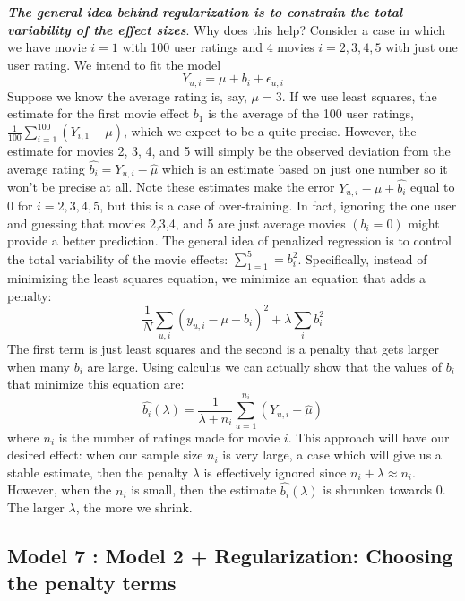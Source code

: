 \documentclass[
]{article}
\begin{document}
\textbf{\emph{The general idea behind regularization is to constrain the
total variability of the effect sizes}}. Why does this help? Consider a
case in which we have movie \(i=1\) with 100 user ratings and 4 movies
\(i=2,3,4,5\) with just one user rating. We intend to fit the model\\
\[Y_{u,i}=\mu+b_{i}+\epsilon_{u,i}\] Suppose we know the average rating
is, say, \(\mu=3\). If we use least squares, the estimate for the first
movie effect \(b_{1}\) is the average of the 100 user ratings,
\(\frac{1}{100}\sum_{i=1}^{100}(Y_{i,1}-\mu)\), which we expect to be a
quite precise. However, the estimate for movies 2, 3, 4, and 5 will
simply be the observed deviation from the average rating
\(\hat{b_{i}}=Y_{u,i}-\hat{\mu}\) which is an estimate based on just one
number so it won't be precise at all. Note these estimates make the
error \(Y_{u,i}-\mu+\hat{b_{i}}\) equal to 0 for \(i=2,3,4,5\), but this
is a case of over-training. In fact, ignoring the one user and guessing
that movies 2,3,4, and 5 are just average movies \((b_{i}=0)\) might
provide a better prediction. The general idea of penalized regression is
to control the total variability of the movie effects:
\(\sum_{1=1}^{5}=b_{i}^2\). Specifically, instead of minimizing the
least squares equation, we minimize an equation that adds a penalty:\\
\[\frac{1}{N}\sum_{u,i}(y_{u,i}-\mu-b_{i})^2+\lambda\sum_{i}b_{i}^2\]
The first term is just least squares and the second is a penalty that
gets larger when many \(b_{i}\) are large. Using calculus we can
actually show that the values of \(b_{i}\) that minimize this equation
are:\\
\[\hat{b_{i}}(\lambda)=\frac{1}{\lambda+n_{i}}\sum_{u=1}^{n_{i}}(Y_{u,i}-\hat{\mu})\]
where \(n_{i}\) is the number of ratings made for movie \(i\). This
approach will have our desired effect: when our sample size \(n_{i}\) is
very large, a case which will give us a stable estimate, then the
penalty \(\lambda\) is effectively ignored since
\(n_{i}+\lambda\approx{n_{i}}\). However, when the \(n_{i}\) is small,
then the estimate \(\hat{b_{i}}(\lambda)\) is shrunken towards 0. The
larger \(\lambda\), the more we shrink.

\newpage

\hypertarget{model-7-model-2-regularization-choosing-the-penalty-terms}{%
\subsection{Model 7 : Model 2 + Regularization: Choosing the penalty
terms}\label{model-7-model-2-regularization-choosing-the-penalty-terms}}
\end{document}
